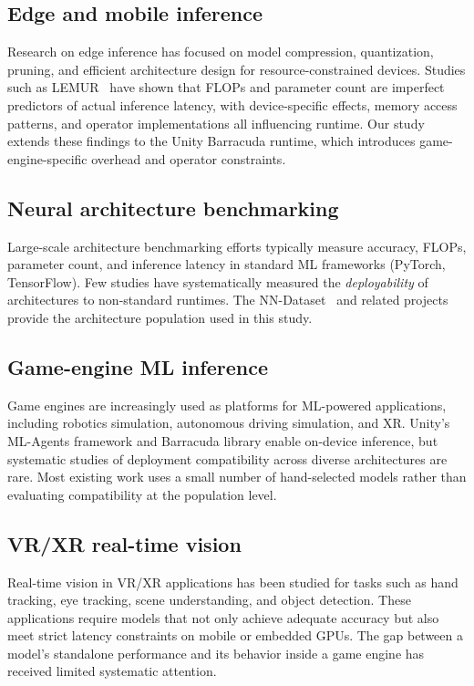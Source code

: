 \documentclass[10pt,twocolumn,letterpaper]{article}
\begin{document}
\subsection{Edge and mobile inference}

Research on edge inference has focused on model compression, quantization, pruning, and efficient architecture design for resource-constrained devices. Studies such as LEMUR~\cite{ABrain.LEMUR2} have shown that FLOPs and parameter count are imperfect predictors of actual inference latency, with device-specific effects, memory access patterns, and operator implementations all influencing runtime. Our study extends these findings to the Unity Barracuda runtime, which introduces game-engine-specific overhead and operator constraints.

\subsection{Neural architecture benchmarking}

Large-scale architecture benchmarking efforts typically measure accuracy, FLOPs, parameter count, and inference latency in standard ML frameworks (PyTorch, TensorFlow). Few studies have systematically measured the \emph{deployability} of architectures to non-standard runtimes. The NN-Dataset~\cite{ABrain.NN-Dataset} and related projects~\cite{ABrain.NNGPT, ABrain.NN-RAG, ABrain.HPGPT, ABrain.Architect} provide the architecture population used in this study.

\subsection{Game-engine ML inference}

Game engines are increasingly used as platforms for ML-powered applications, including robotics simulation, autonomous driving simulation, and XR. Unity's ML-Agents framework and Barracuda library enable on-device inference, but systematic studies of deployment compatibility across diverse architectures are rare. Most existing work uses a small number of hand-selected models rather than evaluating compatibility at the population level.

\subsection{VR/XR real-time vision}

Real-time vision in VR/XR applications has been studied for tasks such as hand tracking, eye tracking, scene understanding, and object detection. These applications require models that not only achieve adequate accuracy but also meet strict latency constraints on mobile or embedded GPUs. The gap between a model's standalone performance and its behavior inside a game engine has received limited systematic attention.
\end{document}
